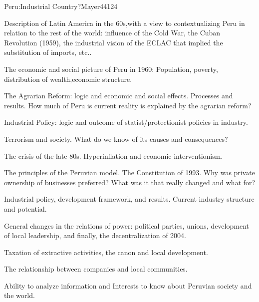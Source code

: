 \begin{syllabus}
\begin{unit}{Peru:Industrial Country?}{}{Mayer44}{12}{4}
   \begin{topics}
      \item Description of Latin America in the 60s,with a view to contextualizing Peru in relation to the rest of the world: influence of the Cold War, the Cuban Revolution (1959), the industrial vision of the ECLAC that implied the substitution of imports, etc..
      \item The economic and social picture of Peru in 1960: Population, poverty, distribution of wealth,economic structure.
      \item The Agrarian Reform: logic and economic and social effects. Processes and results. How much of Peru is current reality is explained by the agrarian reform?
      \item Industrial Policy: logic and outcome of statist/protectionist policies in industry.
      \item Terrorism and society. What do we know of its causes and consequences?
      \item The crisis of the late 80s. Hyperinflation and economic interventionism.
      \item The principles of the Peruvian model. The Constitution of 1993. Why was private ownership of businesses preferred? What was it that really changed and what for?
      \item Industrial policy, development framework, and results. Current industry structure and potential.
      \item General changes in the relations of power: political parties, unions, development of local leadership, and finally, the decentralization of 2004.
      \item Taxation of extractive activities, the canon and local development.
      \item The relationship between companies and local communities.
   \end{topics}
   \begin{learningoutcomes}
      \item Ability to analyze information and Interests to know about Peruvian society and the world.
   \end{learningoutcomes}
\end{unit}

\begin{coursebibliography}
\end{coursebibliography}

\end{syllabus}
